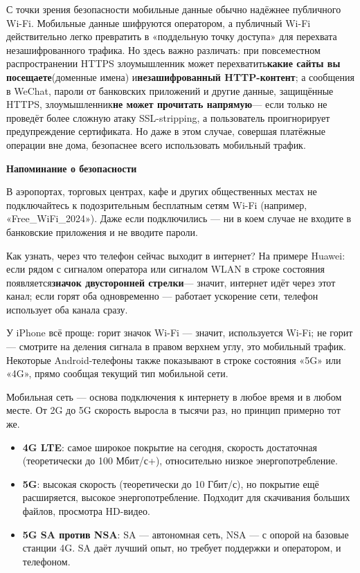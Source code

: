 
С точки зрения безопасности мобильные данные обычно надёжнее публичного Wi-Fi. Мобильные данные шифруются оператором, а публичный Wi-Fi действительно легко превратить в «поддельную точку доступа» для перехвата незашифрованного трафика. Но здесь важно различать: при повсеместном распространении HTTPS злоумышленник может перехватить\textbf{какие сайты вы посещаете}(доменные имена) и\textbf{незашифрованный HTTP-контент}; а сообщения в WeChat, пароли от банковских приложений и другие данные, защищённые HTTPS, злоумышленник\textbf{не может прочитать напрямую}— если только не проведёт более сложную атаку SSL-stripping, а пользователь проигнорирует предупреждение сертификата. Но даже в этом случае, совершая платёжные операции вне дома, безопаснее всего использовать мобильный трафик.

\textbf{Напоминание о безопасности}\par

В аэропортах, торговых центрах, кафе и других общественных местах не подключайтесь к подозрительным бесплатным сетям Wi-Fi (например, «Free\_WiFi\_2024»). Даже если подключились — ни в коем случае не входите в банковские приложения и не вводите пароли.


Как узнать, через что телефон сейчас выходит в интернет? На примере Huawei: если рядом с сигналом оператора или сигналом WLAN в строке состояния появляется\textbf{значок двусторонней стрелки}— значит, интернет идёт через этот канал; если горят оба одновременно — работает ускорение сети, телефон использует оба канала сразу.

У iPhone всё проще: горит значок Wi-Fi — значит, используется Wi-Fi; не горит — смотрите на деления сигнала в правом верхнем углу, это мобильный трафик. Некоторые Android-телефоны также показывают в строке состояния «5G» или «4G», прямо сообщая текущий тип мобильной сети.


Мобильная сеть — основа подключения к интернету в любое время и в любом месте. От 2G до 5G скорость выросла в тысячи раз, но принцип примерно тот же.


\begin{itemize}
  \item \textbf{4G LTE}: самое широкое покрытие на сегодня, скорость достаточная (теоретически до 100 Мбит/с+), относительно низкое энергопотребление.
  \item \textbf{5G}: высокая скорость (теоретически до 10 Гбит/с), но покрытие ещё расширяется, высокое энергопотребление. Подходит для скачивания больших файлов, просмотра HD-видео.
  \item \textbf{5G SA против NSA}: SA — автономная сеть, NSA — с опорой на базовые станции 4G. SA даёт лучший опыт, но требует поддержки и оператором, и телефоном.
\end{itemize}

